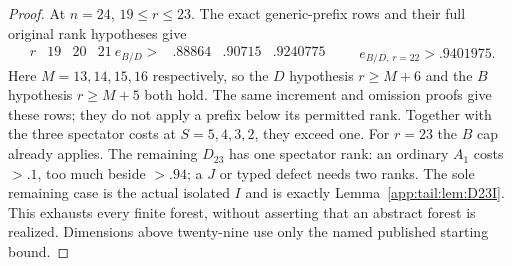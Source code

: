 \documentclass[11pt]{article}
\theoremstyle{definition}
\theoremstyle{remark}
\begin{document}
\begin{proof}
At $n=24$, $19\le r\le23$. The exact generic-prefix rows and
their full original rank hypotheses give
\[
\begin{array}{c|c|c|c}
r&19&20&21\ \hline
e_{B/D}>&.88864&.90715&.9240775
\end{array}
\qquad e_{B/D,\,r=22}>.9401975.
\]
Here $M=13,14,15,16$ respectively, so the $D$ hypothesis
$r\ge M+6$ and the $B$ hypothesis $r\ge M+5$ both hold.
The same increment and omission proofs give these rows; they do
not apply a prefix below its permitted rank. Together with the
three spectator costs at $S=5,4,3,2$, they exceed one.
For $r=23$ the $B$ cap already applies. The remaining $D_{23}$
has one spectator rank: an ordinary $A_1$ costs $>.1$, too much
beside $>.94$; a $J$ or typed defect needs two ranks. The sole
remaining case is the actual isolated $I$ and is exactly
Lemma~\ref{app:tail:lem:D23I}. This exhausts every finite forest,
without asserting that an abstract forest is realized. Dimensions
above twenty-nine use only the named published starting bound.
\end{proof}
\end{document}
